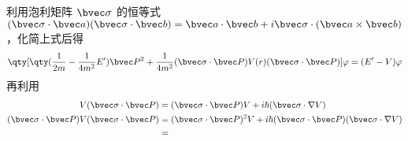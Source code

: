 利用泡利矩阵 $\bvec \sigma$ 的恒等式  $(\bvec \sigma\cdot \bvec a)(\bvec \sigma\cdot \bvec b)=\bvec a\cdot \bvec b+i\bvec \sigma\cdot (\bvec a\times \bvec b)$，化简上式后得
\begin{equation}
\qty[\qty(\frac{1}{2m}-\frac{1}{4m^2}E')\bvec P^2+\frac{1}{4m^2}(\bvec \sigma\cdot \bvec P)V(r)(\bvec \sigma\cdot \bvec P)]\varphi=(E'-V)\varphi
\end{equation}
再利用
\begin{equation}
\begin{aligned}
V(\bvec \sigma\cdot \bvec P)&=(\bvec \sigma\cdot \bvec P)V+i\hbar (\bvec \sigma\cdot \nabla V)\\
(\bvec \sigma\cdot \bvec P)V(\bvec \sigma\cdot \bvec P)&=(\bvec \sigma\cdot \bvec P)^2 V+i\hbar (\bvec \sigma\cdot \bvec P)(\bvec \sigma\cdot \nabla V)\\
&=
\end{aligned}
\end{equation}
